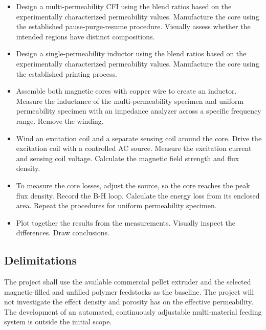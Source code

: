 \begin{itemize}
  \item Design a multi-permeability CFI using the blend ratios based on the experimentally characterized permeability values. Manufacture the core using the established pause-purge-resume procedure. Visually assess whether the intended regions have distinct compositions.
  \item Design a single-permeability inductor using the blend ratios based on the experimentally characterized permeability values. Manufacture the core using the established printing process.
  \item Assemble both magnetic cores with copper wire to create an inductor. Measure the inductance of the multi-permeability specimen and uniform permeability specimen with an impedance analyzer across a specific frequency range. Remove the winding. 
  \item Wind an excitation coil and a separate sensing coil around the core. Drive the  excitation coil with a controlled AC source. Measure the excitation current and sensing coil voltage. Calculate the magnetic field strength and flux density. 
  \item To measure the core losses, adjust the source, so the core reaches the peak flux density. Record the B-H loop. Calculate the energy loss from its enclosed area. Repeat the procedures for uniform permeability specimen. 
  \item Plot together the results from the measurements. Visually inspect the differences. Draw conclusions.
\end{itemize}

\subsection{Delimitations}
The project shall use the available commercial pellet extruder and the selected magnetic-filled and unfilled polymer feedstocks as the baseline. The project will not investigate the effect density and porosity has on the effective permeability. The development of an automated, continuously adjustable multi-material feeding system is outside the initial scope.